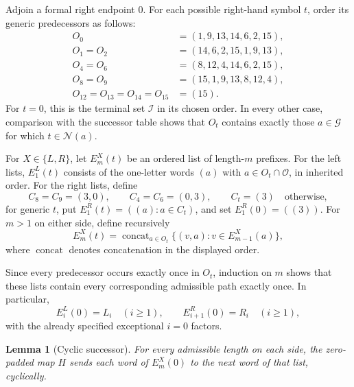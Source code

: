 \documentclass[11pt]{article}
\newtheorem{lemma}[theorem]{Lemma}
\theoremstyle{remark}
\newcommand{\InnerSet}{\mathcal I}
\newcommand{\OuterSet}{\mathcal O}
\newcommand{\GenericSet}{\mathcal G}
\newcommand{\NextSet}{\mathcal N}
\begin{document}
Adjoin a formal right endpoint $0$.  For each possible right-hand symbol $t$,
order its generic predecessors as follows:
\begin{align*}
O_0&=(1,9,13,14,6,2,15),\\
O_1=O_2&=(14,6,2,15,1,9,13),\\
O_4=O_6&=(8,12,4,14,6,2,15),\\
O_8=O_9&=(15,1,9,13,8,12,4),\\
O_{12}=O_{13}=O_{14}=O_{15}&=(15).
\end{align*}
For $t=0$, this is the terminal set $\InnerSet$ in its chosen order.  In every
other case, comparison with the successor table shows that $O_t$ contains
exactly those $a\in\GenericSet$ for which $t\in\NextSet(a)$.

For $X\in\{L,R\}$, let $E_m^X(t)$ be an ordered list of length-$m$ prefixes.
For the left lists, $E_1^L(t)$ consists of the one-letter words $(a)$ with
$a\in O_t\cap\OuterSet$, in inherited order.  For the right lists, define
\[
 C_8=C_9=(3,0),\qquad C_4=C_6=(0,3),\qquad C_t=(3)
 \quad\text{otherwise},
\]
for generic $t$, put $E_1^R(t)=((a):a\in C_t)$, and set
$E_1^R(0)=((3))$.  For $m>1$ on either side, define recursively
\begin{equation}\label{eq:Erec}
 E_m^X(t)=\mathop{\operatorname{concat}}_{a\in O_t}
 \{(v,a):v\in E_{m-1}^X(a)\},
\end{equation}
where $\operatorname{concat}$ denotes concatenation in the displayed order.

Since every predecessor occurs exactly once in $O_t$, induction on $m$ shows
that these lists contain every corresponding admissible path exactly once.
In particular,
\begin{equation}\label{eq:E-language}
 E_i^L(0)=L_i\quad(i\geq1),\qquad
 E_{i+1}^R(0)=R_i\quad(i\geq1),
\end{equation}
with the already specified exceptional $i=0$ factors.

\begin{lemma}[Cyclic successor]\label{lem:successor}
For every admissible length on each side, the zero-padded map $H$ sends each
word of $E_m^X(0)$ to the next word of that list, cyclically.
\end{lemma}
\end{document}
